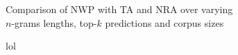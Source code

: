 \begin{figure}[p!]
  \centering
  \hspace{2.5cm}Comparison of NWP with TA and NRA over varying\\
  \hspace{2.5cm}$n$-grams lengths, top-$k$ predictions and corpus sizes
  \\[1.5ex]
  \begin{minipage}{1.4\textwidth}
    \centering
    \hspace{-0.2\textwidth}
    
  \end{minipage}
  \caption{lol}
  \label{fig:evaluation-comp-nra-ta}
\end{figure}

